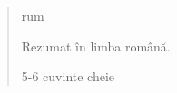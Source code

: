 \begin{abstract}
    \markboth{\abstractname}{}
\begin{scontents}[store-env=lang]
rum
\end{scontents}
\begin{scontents}[store-env=abstracts,print-env=true]
Rezumat în limba română.
\end{scontents}

\begin{scontents}[store-env=keywords,print-env=true]
5-6 cuvinte cheie
\end{scontents}
\end{abstract}
\cleardoublepage
{}
